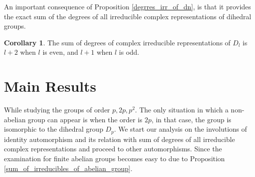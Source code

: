 \documentclass{amsart}
\theoremstyle{definition}
\newtheorem{corollary}[theorem]{Corollary}
\theoremstyle{remark}
\numberwithin{equation}{section}
\begin{document}
    An important consequence of Proposition \ref{degrres_irr_of_dn}, is that it provides the exact sum of the degrees of all irreducible complex representations of dihedral groups.
    \begin{corollary}\label{sum_of_irrep_dimensions}
        The sum of degrees of complex irreducible representations of $D_l$ is $l + 2$ when $l$ is even, and $l + 1$ when $l$ is odd.
    \end{corollary}

    \section{Main Results}
        While studying the groups of order $p, 2p, p^2$. The only situation in which a non-abelian group can appear is when the order is $2p$, in that case, the group is isomorphic to the dihedral group $D_p$. We start our analysis on the involutions of identity automorphism and its relation with sum of degrees of all irreducible complex representations and proceed to other automorphisms. Since the examination for finite abelian groups becomes easy to due to Proposition \ref{sum_of_irreducibles_of_abelian_group}.
        
\end{document}
